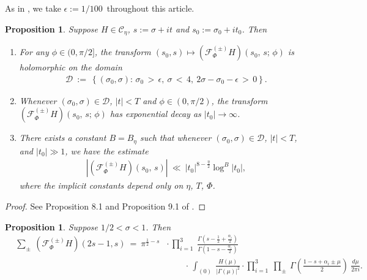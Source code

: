 \documentclass[11pt,reqno]{amsart}
\newtheorem{prop}[thm]{Proposition}
\theoremstyle{definition}
\theoremstyle{definition}
\theoremstyle{remark}
\numberwithin{equation}{section}
\begin{document}
	
			
			As in \cite{Kw23, Kw23a+}, we take $\epsilon:=1/100$\,  throughout this article. 
			
			
			\begin{prop}\label{anconpr}
				Suppose  $H\in \mathcal{C}_{\eta}$, $s:= \sigma+it$ and $s_{0}:= \sigma_{0}+it_{0}$. Then
				
				\begin{enumerate}
					
					\item For any $\phi \in (0, \pi/2]$, the transform   $(s_{0}, s)\mapsto (\mathcal{F}_{\Phi}^{(\pm)}H)(s_{0},\, s;\, \phi)$  is holomorphic on the domain
					\begin{align}\label{newdomain}
				  \mathcal{D} \ := \  \left\{  (\sigma_{0}, \sigma): \,    \sigma_{0} \, > \,  \epsilon,  \  \sigma \, < \, 4, \   2\sigma-\sigma_{0}-\epsilon \, > \, 0 \right\}.	
					\end{align}
					
					\item Whenever $(\sigma_{0}, \sigma) \in \mathcal{D}$,  $|t| <T$ and $\phi \in (0, \pi/2)$, the transform $(\mathcal{F}_{\Phi}^{(\pm)}H)\left(s_{0}, \, s; \, \phi\right)$ has exponential decay as  $|t_{0}| \to \infty$.   
					
					\item There exists a constant  $B=B_{\eta}$ such that  whenever $(\sigma_{0}, \sigma) \in 
					\mathcal{D}$, $|t| <T$, and $|t_{0}| \gg 1$,  we have the estimate
					\begin{align}\label{refbdd}
						\left|(\mathcal{F}_{\Phi}^{(\pm)}H)\left(s_{0}, \, s\right) \right| \ \ll \  |t_{0}|^{8-\frac{\eta}{2}}   \log^{B} |t_{0}|,
					\end{align}
					where the implicit constants depend only on $\eta$, $T$, $\Phi$. 
				\end{enumerate}
			\end{prop}
			
			\begin{proof}
				See Proposition 8.1 and Proposition 9.1 of  \cite{Kw23}.
			\end{proof}
			
			
			 	\begin{prop}\label{secMTcom}
				Suppose  $1/2  <  \sigma  < 1$. Then 
				\begin{align}\label{secMTcomid}
				\hspace{10pt} 	\sum_{\pm} \ (\mathcal{F}^{(\pm)}_{\Phi} H)\left(2s-1,  s \right) 
					\ = \ \pi^{\frac{1}{2}-s}  &\cdot \,  \prod_{i=1}^{3} \ \frac{\Gamma\left(s-\frac{1}{2}+ \frac{\alpha_{i}}{2}\right)}{\Gamma\left(1-s- \frac{\alpha_{i}}{2}\right)} \nonumber\\
					&\hspace{25pt}  \cdot \,  \int_{(0)} \  \frac{H(\mu)}{\left| \Gamma(\mu)\right|^2}   \cdot \prod\limits_{i=1}^{3}  \ \prod\limits_{\pm} \  \Gamma\left( \frac{1-s+ \alpha_{i}\pm \mu}{2}\right) \ \frac{d\mu}{2\pi i}. 
				\end{align}
			\end{prop}
			
\end{document}
